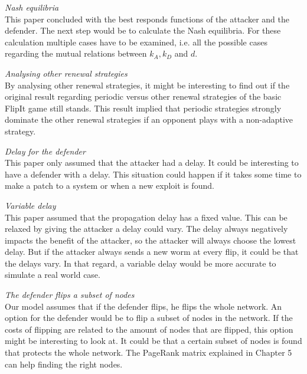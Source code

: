 \begin{description}
\item \textit{Nash equilibria}\\ This paper concluded with the best responds functions of the attacker and the defender. The next step would be to calculate the Nash equilibria. For these calculation multiple cases have to be examined, i.e. all the possible cases regarding the mutual relations between $k_{A}, k_{D}$ and $d$. 
\item \textit{Analysing other renewal strategies} \\ By analysing other renewal strategies, it might be interesting to find out if the original result regarding periodic versus other renewal strategies of the basic FlipIt game still stands. This result implied that periodic strategies strongly dominate the other renewal strategies if an opponent plays with a non-adaptive strategy. 
\item \textit{Delay for the defender}\\ This paper only assumed that the attacker had a delay. It could be interesting to have a defender with a delay. This situation could happen if it takes some time to make a patch to a system or when a new exploit is found. 
\item \textit{Variable delay} \\This paper assumed that the propagation delay has a fixed value. This can be relaxed by giving the attacker a delay could vary. The delay always negatively impacts the benefit of the attacker, so the attacker will always choose the lowest delay. But if the attacker always sends a new worm at every flip, it could be that the delays vary. In that regard, a variable delay would be more accurate to simulate a real world case. 
\item \textit{The defender flips a subset of nodes} \\ Our model assumes that if the defender flips, he flips the whole network. An option for the defender would be to flip a subset of nodes in the network. If the costs of flipping are related to the amount of nodes that are flipped, this option might be interesting to look at. It could be that a certain subset of nodes is found that protects the whole network. The PageRank matrix explained in Chapter 5 can help finding the right nodes. \\

\end{description}




